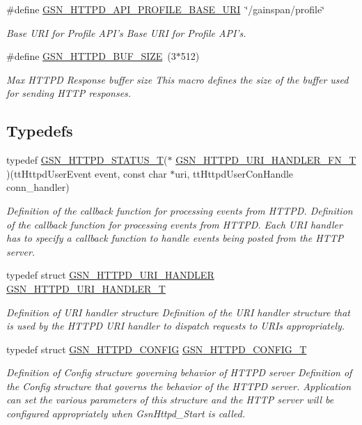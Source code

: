 \begin{DoxyCompactItemize}
\#define \hyperlink{a00666_ga0d52f5c67895eb49f4680ca1b4d97498}{GSN\_\-HTTPD\_\-API\_\-PROFILE\_\-BASE\_\-URI}~\char`\"{}/gainspan/profile\char`\"{}
\begin{DoxyCompactList}\small\item\em Base URI for Profile API's Base URI for Profile API's. \end{DoxyCompactList}\item 
\#define \hyperlink{a00666_ga65ea05b0dabc770285f0a18270af5fc7}{GSN\_\-HTTPD\_\-BUF\_\-SIZE}~(3$\ast$512)
\begin{DoxyCompactList}\small\item\em Max HTTPD Response buffer size This macro defines the size of the buffer used for sending HTTP responses. \end{DoxyCompactList}\end{DoxyCompactItemize}
\subsection*{Typedefs}
\begin{DoxyCompactItemize}
\item 
typedef \hyperlink{a00666_ga97ddf6ff1568f9984c83a2161cd9f49d}{GSN\_\-HTTPD\_\-STATUS\_\-T}($\ast$ \hyperlink{a00666_ga37351c58635a4a2a10675d5ea28e37be}{GSN\_\-HTTPD\_\-URI\_\-HANDLER\_\-FN\_\-T} )(ttHttpdUserEvent event, const char $\ast$uri, ttHttpdUserConHandle conn\_\-handler)
\begin{DoxyCompactList}\small\item\em Definition of the callback function for processing events from HTTPD. Definition of the callback function for processing events from HTTPD. Each URI handler has to specify a callback function to handle events being posted from the HTTP server. \end{DoxyCompactList}\item 
typedef struct \hyperlink{a00097}{GSN\_\-HTTPD\_\-URI\_\-HANDLER} \hyperlink{a00666_ga3dd2e2bbc2820f5f49868effb95b371a}{GSN\_\-HTTPD\_\-URI\_\-HANDLER\_\-T}
\begin{DoxyCompactList}\small\item\em Definition of URI handler structure Definition of the URI handler structure that is used by the HTTPD URI handler to dispatch requests to URIs appropriately. \end{DoxyCompactList}\item 
typedef struct \hyperlink{a00095}{GSN\_\-HTTPD\_\-CONFIG} \hyperlink{a00666_ga5049df4d9f9df24293e341c70976f6c3}{GSN\_\-HTTPD\_\-CONFIG\_\-T}
\begin{DoxyCompactList}\small\item\em Definition of Config structure governing behavior of HTTPD server Definition of the Config structure that governs the behavior of the HTTPD server. Application can set the various parameters of this structure and the HTTP server will be configured appropriately when GsnHttpd\_\-Start is called. \end{DoxyCompactList}\end{DoxyCompactItemize}
